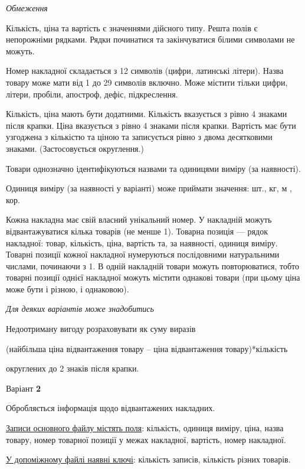 \documentclass[11pt, ukrainian]{article}
\begin{document}
\bigskip\textit{Обмеження}

Кількість, ціна та вартість є значеннями дійсного типу.
Решта полів є непорожніми рядками.
Рядки починатися та закінчуватися білими символами не можуть.

Номер накладної складається з 12 символів (цифри, латинські літери).
Назва товару може мати від 1 до 29 символів включно.
Може містити тільки цифри, літери, пробіли, апостроф, дефіс, підкреслення.

Кількість, ціна мають бути додатними.
Кількість вказується з рівно 4 знаками після крапки.
Ціна вказується з рівно 4 знаками після крапки.
Вартість має бути узгоджена з кількістю та ціною та записується рівно з двома десятковими знаками.
(Застосовується округлення.)

Товари однозначно ідентифікуються назвами та одиницями виміру (за наявності).

Одиниця виміру (за наявності у варіанті) може приймати значення: шт., кг, м , кор.

Кожна накладна має свій власний унікальний номер.
У накладній можуть відвантажуватися кілька товарів (не менше 1).
Товарна позиція --- рядок накладної: товар, кількість, ціна, вартість та, за наявності, одиниця виміру.
Товарні позиції кожної накладної нумеруються послідовними натуральними числами, починаючи з 1.
В одній накладній товари можуть повторюватися, 
тобто товарні позиції однієї накладної можуть містити однакові товари 
(при цьому ціна може бути і різною, і однаковою).

\bigskip\textit{Для деяких варіантів може знадобитись}

Недоотриману вигоду розраховувати як суму виразів
{\center (найбільша ціна відвантаження товару – ціна відвантаження товару)*кількість\par}

\bigskip
{\noindent} округлених до 2 знаків після крапки.


\par
\newpage
{\center Варіант  \No \textbf { 2 }\par}
\bigskip
Обробляється інформація щодо відвантажених накладних.

\underline{Записи основного файлу містять поля}: кількість, одиниця виміру, ціна, назва товару, номер товарної позиції у межах накладної, вартість, номер накладної.

\underline{У допоміжному файлі наявні ключі}: кількість записів, кількість різних товарів.
\end{document}
